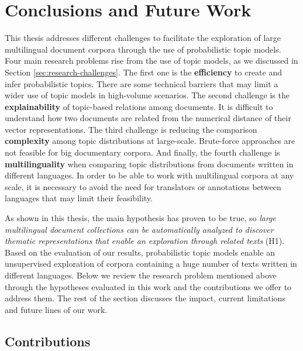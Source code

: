 

\chapter{Conclusions and Future Work}\label{ch:conclusion}

\graphicspath{{conclusions/figures/}}

This thesis addresses different challenges to facilitate the exploration of large multilingual document corpora through the use of probabilistic topic models. Four main research problems rise from the use of topic models, as we discussed in Section \ref{sec:research-challenges}. The first one is the \textbf{efficiency} to create and infer probabilistic topics. There are some technical barriers that may limit a wider use of topic models in high-volume scenarios. The second challenge is the \textbf{explainability} of topic-based relations among documents. It is difficult to understand how two documents are related from the numerical distance of their vector representations. The third challenge is reducing the comparison \textbf{complexity} among topic distributions at large-scale. Brute-force approaches are not feasible for big documentary corpora. And finally, the fourth challenge is \textbf{multilinguality} when comparing topic distributions from documents written in different languages. In order to be able to work with multilingual corpora at any scale, it is necessary to avoid the need for translators or annotations between languages that may limit their feasibility.

As shown in this thesis, the main hypothesis has proven to be true, so \textit{large multilingual document collections can be automatically analyzed to discover thematic representations that enable an exploration through related texts} (H1). Based on the evaluation of our results, probabilistic topic models enable an unsupervised exploration of corpora containing a huge number of texts written in different languages. Below we review the research problem mentioned above through the hypotheses evaluated in this work and the contributions we offer to address them. The rest of the section discusses the impact, current limitations and future lines of our work. 


\section{Contributions}


